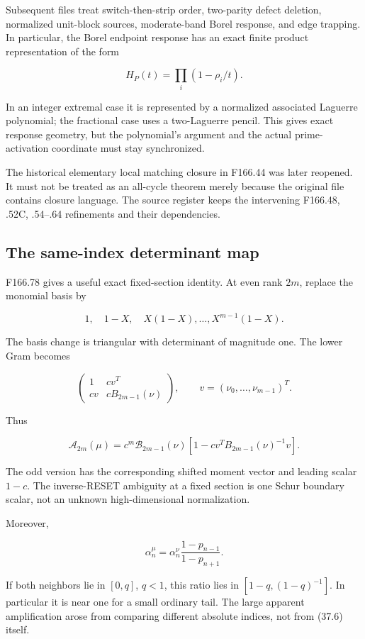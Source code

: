 \documentclass[
  10pt,
  a4paper,
  10pt,
  oneside,
  openany]{book}
\begin{document}
Subsequent files treat switch-then-strip order, two-parity defect
deletion, normalized unit-block sources, moderate-band Borel response,
and edge trapping. In particular, the Borel endpoint response has an
exact finite product representation of the form

\[
 H_P(t)=\prod_i(1-\rho_i/t).
 \tag{37.4}\label{eq:37.4}
\]

In an integer extremal case it is represented by a normalized associated
Laguerre polynomial; the fractional case uses a two-Laguerre pencil.
This gives exact response geometry, but the polynomial's argument and
the actual prime-activation coordinate must stay synchronized.

The historical elementary local matching closure in F166.44 was later
reopened. It must not be treated as an all-cycle theorem merely because
the original file contains closure language. The source register keeps
the intervening F166.48, .52C, .54--.64 refinements and their
dependencies.

\subsection{The same-index determinant
map}\label{the-same-index-determinant-map}

F166.78 gives a useful exact fixed-section identity. At even rank
\(2m\), replace the monomial basis by

\[
 1,\quad1-X,\quad X(1-X),\ldots,X^{m-1}(1-X).
\]

The basis change is triangular with determinant of magnitude one. The
lower Gram becomes

\[
 \begin{pmatrix}1&cv^T\\cv&cB_{2m-1}(\nu)\end{pmatrix},
 \qquad v=(\nu_0,\ldots,\nu_{m-1})^T.
\]

Thus

\[
 \mathcal A_{2m}(\mu)
 =c^m\mathcal B_{2m-1}(\nu)
 [1-cv^TB_{2m-1}(\nu)^{-1}v].
 \tag{37.5}\label{eq:37.5}
\]

The odd version has the corresponding shifted moment vector and leading
scalar \(1-c\). The inverse-RESET ambiguity at a fixed section is one
Schur boundary scalar, not an unknown high-dimensional normalization.

Moreover,

\[
 \boxed{\alpha_n^\mu=
 \alpha_n^\nu\frac{1-p_{n-1}}{1-p_{n+1}}.}
 \tag{37.6}\label{eq:37.6}
\]

If both neighbors lie in \([0,q]\), \(q<1\), this ratio lies in
\([1-q,(1-q)^{-1}]\). In particular it is near one for a small ordinary
tail. The large apparent amplification arose from comparing different
absolute indices, not from (37.6) itself.
\end{document}
